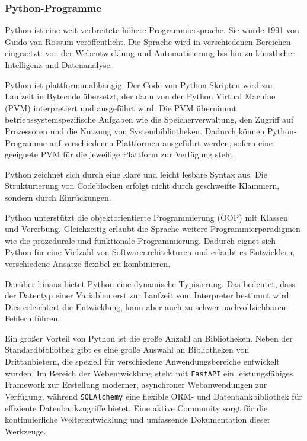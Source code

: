 \documentclass[12pt, letterpaper]{article}
\begin{document}
  \subsubsection{Python-Programme}
  \par Python ist eine weit verbreitete höhere Programmiersprache. Sie wurde 1991 von Guido van Rossum veröffentlicht. Die Sprache wird in verschiedenen Bereichen eingesetzt: von der Webentwicklung und Automatisierung bis hin zu künstlicher Intelligenz und Datenanalyse.
  \par Python ist plattformunabhängig. Der Code von Python-Skripten wird zur Laufzeit in Bytecode übersetzt, der dann von der Python Virtual Machine (PVM) interpretiert und ausgeführt wird. Die PVM übernimmt betriebssystemspezifische Aufgaben wie die Speicherverwaltung, den Zugriff auf Prozessoren und die Nutzung von Systembibliotheken. Dadurch können Python-Programme auf verschiedenen Plattformen ausgeführt werden, sofern eine geeignete PVM für die jeweilige Plattform zur Verfügung steht.
  \par Python zeichnet sich durch eine klare und leicht lesbare Syntax aus. Die Strukturierung von Codeblöcken erfolgt nicht durch geschweifte Klammern, sondern durch Einrückungen.
  \par Python unterstützt die objektorientierte Programmierung (OOP) mit Klassen und Vererbung. Gleichzeitig erlaubt die Sprache weitere Programmierparadigmen wie die prozedurale und funktionale Programmierung. Dadurch eignet sich Python für eine Vielzahl von Softwarearchitekturen und erlaubt es Entwicklern, verschiedene Ansätze flexibel zu kombinieren.
  \par Darüber hinaus bietet Python eine dynamische Typisierung. Das bedeutet, dass der Datentyp einer Variablen erst zur Laufzeit vom Interpreter bestimmt wird. Dies erleichtert die Entwicklung, kann aber auch zu schwer nachvollziehbaren Fehlern führen.
  \par Ein großer Vorteil von Python ist die große Anzahl an Bibliotheken. Neben der Standardbibliothek gibt es eine große Auswahl an Bibliotheken von Drittanbietern, die speziell für verschiedene Anwendungsbereiche entwickelt wurden. Im Bereich der Webentwicklung steht mit \texttt{FastAPI} ein leistungsfähiges Framework zur Erstellung moderner, asynchroner Webanwendungen zur Verfügung, während \texttt{SQLAlchemy} eine flexible ORM- und Datenbankbibliothek für effiziente Datenbankzugriffe bietet. Eine aktive Community sorgt für die kontinuierliche Weiterentwicklung und umfassende Dokumentation dieser Werkzeuge.
\end{document}
